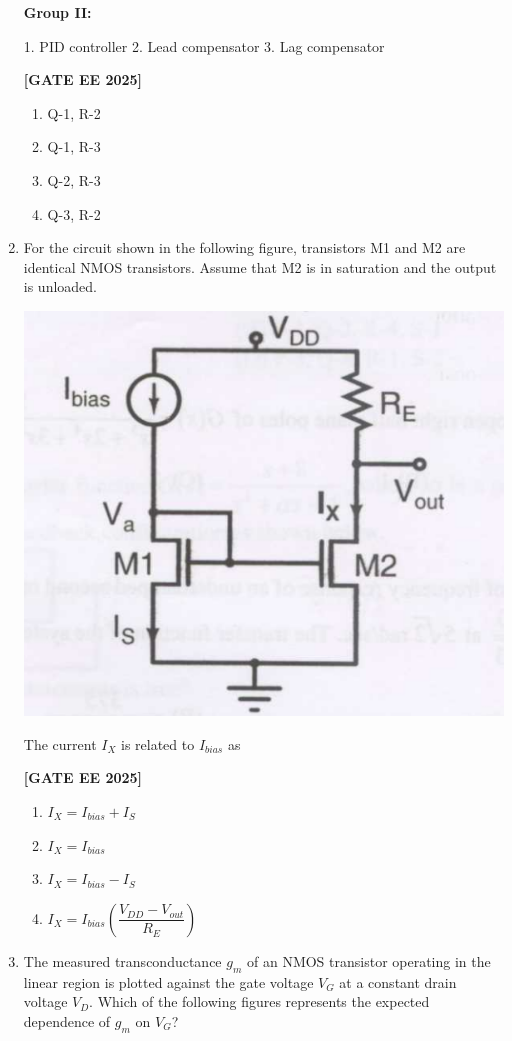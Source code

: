\documentclass[12pt]{article}
\begin{document}
\begin{enumerate}[leftmargin=*, label=\textbf{Q.\arabic*:}]
\textbf{Group II:}

1. PID controller\hspace{1em}
2. Lead compensator\hspace{1em}
3. Lag compensator
 
\noindent \textbf{[GATE EE 2025]}
\begin{enumerate}
  \item Q-1, R-2
  \item Q-1, R-3
  \item Q-2, R-3
  \item Q-3, R-2
\end{enumerate}

\item For the circuit shown in the following figure, transistors M1 and M2 are identical NMOS transistors. Assume that M2 is in saturation and the output is unloaded.
\begin{center}
\includegraphics[width=0.5\columnwidth]{figs/q44.png}
\end{center}

The current $I_X$ is related to $I_{bias}$ as
 
\noindent \textbf{[GATE EE 2025]}
\begin{enumerate}
  \item $I_X = I_{bias} + I_S$
  \item $I_X = I_{bias}$
  \item $I_X = I_{bias} - I_S$
  \item $I_X = I_{bias}\left( \dfrac{V_{DD} - V_{out}}{R_E} \right)$
\end{enumerate}

\item The measured transconductance $g_m$ of an NMOS transistor operating in the linear region is plotted against the gate voltage $V_G$ at a constant drain voltage $V_D$. Which of the following figures represents the expected dependence of $g_m$ on $V_G$?
 

\end{enumerate}
\end{document}
